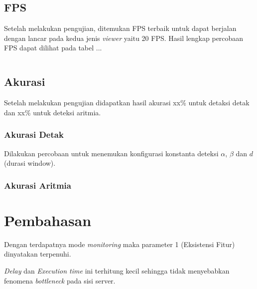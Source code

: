 \subsection{FPS}
Setelah melakukan pengujian, ditemukan FPS terbaik untuk dapat berjalan dengan lancar pada kedua jenis \textit{viewer} yaitu 20 FPS. Hasil lengkap percobaan FPS dapat dilihat pada tabel ...

\begin{table}[H]
	\centering
	\begin{tabular}{|l|l|l|l|}
	
	\end{tabular}
\end{table}

\subsection{Akurasi}
Setelah melakukan pengujian didapatkan hasil akurasi xx\% untuk detaksi detak dan xx\% untuk deteksi aritmia.
\subsubsection{Akurasi Detak}
Dilakukan percobaan untuk menemukan konfigurasi konstanta deteksi $\alpha$, $\beta$ dan $d$ (durasi window).
\subsubsection{Akurasi Aritmia}

\section{Pembahasan}
Dengan terdapatnya mode \textit{monitoring} maka parameter 1 (Eksistensi Fitur) dinyatakan terpenuhi.


\textit{Delay} dan \textit{Execution time} ini terhitung kecil sehingga tidak menyebabkan fenomena \textit{bottleneck} pada sisi server.